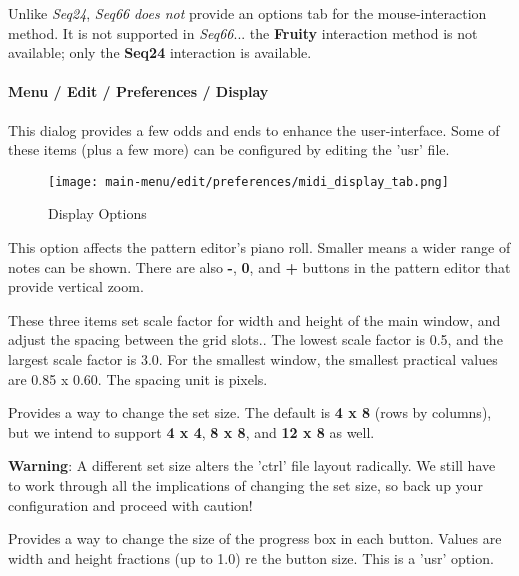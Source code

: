    Unlike \textsl{Seq24}, \textsl{Seq66}
   \textsl{does not} provide an options tab for
   the mouse-interaction method.
   It is not supported in \textsl{Seq66}...
   the \textbf{Fruity} interaction method is not available;
   only the \textbf{Seq24} interaction is available.
 
\paragraph{Menu / Edit / Preferences / Display}
\label{paragraph:menu_edit_preferences_display}

   This dialog provides a few odds and ends to enhance the user-interface.
   Some of these items (plus a few more) can be configured by editing the 'usr'
   file.

\begin{figure}[H]
   \centering 
   \texttt{[image: main-menu/edit/preferences/midi\_display\_tab.png]}
   \caption{Display Options}
   \label{fig:midi_display_tab}
\end{figure}

   \setcounter{ItemCounter}{0}      %

   This option affects the pattern editor's piano roll.  Smaller means a wider
   range of notes can be shown.  There are also
   \textbf{-},
   \textbf{0}, and
   \textbf{+} buttons in the pattern editor that provide
   vertical zoom.

   These three items set scale factor for width and height of the main window,
   and adjust the spacing between the grid slots..
   The lowest scale factor is 0.5, and the largest scale factor is 3.0.
   For the smallest window, the smallest practical values are 0.85 x 0.60.
   The spacing unit is pixels.

   Provides a way to change the set size.  The default is
   \textbf{4 x 8}
   (rows by columns), but we intend to support
   \textbf{4 x 4},
   \textbf{8 x 8}, and
   \textbf{12 x 8}
   as well.

   \textbf{Warning}:
   A different set size alters the 'ctrl' file layout radically.
   We still have to work through all the implications of changing the set size,
   so back up your configuration and proceed with caution!

   Provides a way to change the size of the progress box in each button.
   Values are width and height fractions (up to 1.0) re the button size.
   This is a 'usr' option.

